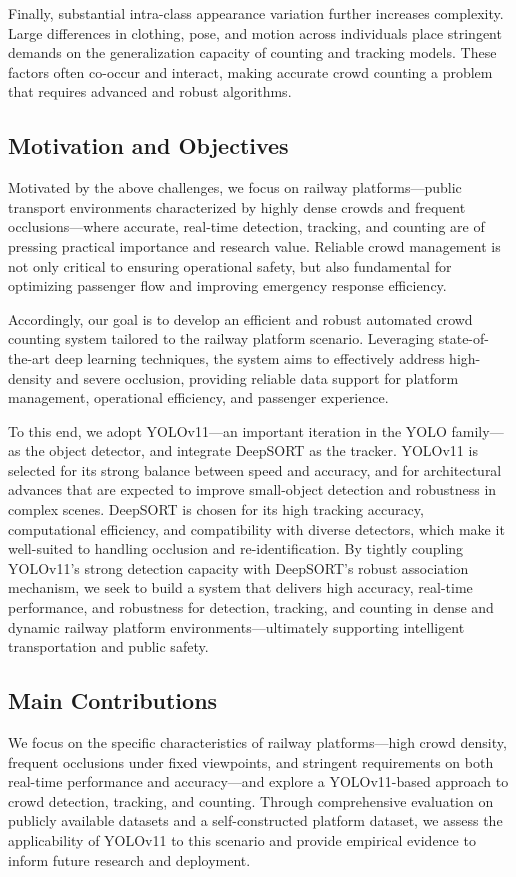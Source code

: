 Finally, substantial intra-class appearance variation further increases complexity. Large differences in clothing, pose, and motion across individuals\cite{33or34_li_lightweight_2023}\cite{66_zhang_bus_2020}\cite{30_khan_passenger_2020}\cite{01_noauthor_deep_2024} place stringent demands on the generalization capacity of counting and tracking models. These factors often co-occur and interact, making accurate crowd counting a problem that requires advanced and robust algorithms.

\subsection{Motivation and Objectives}
Motivated by the above challenges, we focus on railway platforms—public transport environments characterized by highly dense crowds and frequent occlusions—where accurate, real-time detection, tracking, and counting are of pressing practical importance and research value. Reliable crowd management is not only critical to ensuring operational safety\cite{214}, but also fundamental for optimizing passenger flow\cite{215} and improving emergency response efficiency\cite{216}.

Accordingly, our goal is to develop an efficient and robust automated crowd counting system tailored to the railway platform scenario. Leveraging state-of-the-art deep learning techniques, the system aims to effectively address high-density and severe occlusion, providing reliable data support for platform management, operational efficiency, and passenger experience.

To this end, we adopt YOLOv11—an important iteration in the YOLO family—as the object detector, and integrate DeepSORT as the tracker. YOLOv11 is selected for its strong balance between speed and accuracy\cite{141}, and for architectural advances that are expected to improve small-object detection and robustness in complex scenes. DeepSORT is chosen for its high tracking accuracy, computational efficiency, and compatibility with diverse detectors, which make it well-suited to handling occlusion and re-identification. By tightly coupling YOLOv11's strong detection capacity with DeepSORT's robust association mechanism, we seek to build a system that delivers high accuracy, real-time performance, and robustness for detection, tracking, and counting in dense and dynamic railway platform environments—ultimately supporting intelligent transportation and public safety.

\subsection{Main Contributions}
We focus on the specific characteristics of railway platforms—high crowd density, frequent occlusions under fixed viewpoints, and stringent requirements on both real-time performance and accuracy—and explore a YOLOv11-based approach to crowd detection, tracking, and counting. Through comprehensive evaluation on publicly available datasets and a self-constructed platform dataset, we assess the applicability of YOLOv11 to this scenario and provide empirical evidence to inform future research and deployment.


